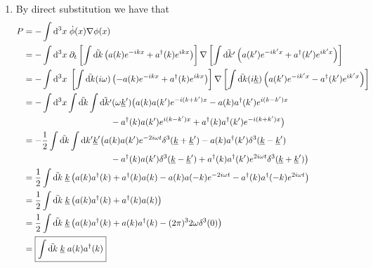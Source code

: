 \documentclass[12pt]{article}
\begin{document}
\begin{enumerate}[label=(\alph*)]
    \item By direct substitution we have that
    \begin{align*}
        P &= -\int\dd^3x\;\dot{\phi}(x)\nabla\phi(x) \\
        &= -\int\dd^3x\;\partial_t \left[\int\tilde{\dd k}\left(a(k)e^{-ikx} + a^\dag(k)e^{ikx}\right)\right]\nabla\left[\int\tilde{\dd k'}\left(a(k')e^{-ik'x} + a^\dag(k')e^{ik'x}\right)\right] \\
        &= -\int\dd^3x\; \left[\int\tilde{\dd k}(i\omega)\left(-a(k)e^{-ikx} + a^\dag(k)e^{ikx}\right)\right]\nabla\left[\int\tilde{\dd k}(i\underline{k})\left(a(k')e^{-ik'x} - a^\dag(k')e^{ik'x}\right)\right] \\
        &= -\int\dd^3x\int\tilde{\dd k}\int\tilde{\dd k'}(\omega\underline{k}') \big{(} a(k)a(k')e^{-i(k+k')x} - a(k)a^\dag(k')e^{i(k-k')x} \\ 
        &\qquad\qquad\qquad\qquad\qquad - a^\dag(k)a(k')e^{i(k-k')x} + a^\dag(k)a^\dag(k')e^{-i(k+k')x}\big{)} \\
        &= -\frac{1}{2}\int\tilde{\dd k}\int\dd k' \underline{k}'\big{(}a(k)a(k')e^{-2i\omega t}\delta^3(\underline{k}+\underline{k}') - a(k)a^\dag(k')\delta^3(\underline{k}-\underline{k}') \\
        &\qquad\qquad\qquad\qquad\qquad - a^\dag(k)a(k')\delta^3(\underline{k}-\underline{k}') + a^\dag(k)a^\dag(k')e^{2i\omega t}\delta^3(\underline{k}+\underline{k}')\big{)} \\
        &= \frac{1}{2}\int\tilde{\dd k} \; \underline{k} \left(a(k)a^\dag(k) + a^\dag(k)a(k) - a(k)a(-k)e^{-2i\omega t} - a^\dag(k)a^\dag(-k)e^{2i\omega t}\right) \\
        &= \frac{1}{2}\int\tilde{\dd k} \; \underline{k} \left(a(k)a^\dag(k) + a^\dag(k)a(k)\right) \\
        &= \frac{1}{2}\int\tilde{\dd k} \; \underline{k} \left(a(k)a^\dag(k) + a(k)a^\dag(k) - (2\pi)^32\omega\delta^3(0)\right) \\
        &= \boxed{\int\tilde{\dd k}\;\underline{k}\;a(k)a^\dag(k)}
    \end{align*}
\end{enumerate}
\end{document}
